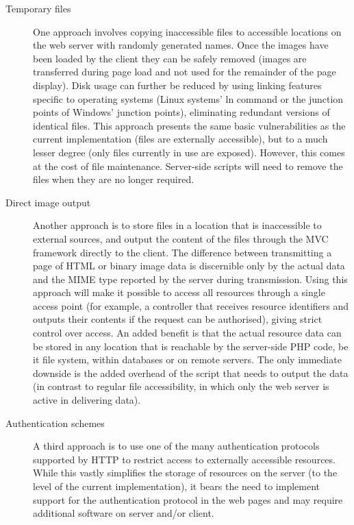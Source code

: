 \begin{description}
    \item[Temporary files] One approach involves copying inaccessible files to accessible locations on the web server with randomly generated names. Once the images have been loaded by the client they can be safely removed (images are transferred during page load and not used for the remainder of the page display). Disk usage can further be reduced by using linking features specific to operating systems (Linux systems' ln command or the junction points of Windows' junction points), eliminating redundant versions of identical files. This approach presents the same basic vulnerabilities as the current implementation (files are externally accessible), but to a much lesser degree (only files currently in use are exposed). However, this comes at the cost of file maintenance. Server-side scripts will need to remove the files when they are no longer required.
    \item[Direct image output] Another approach is to store files in a location that is inaccessible to external sources, and output the content of the files through the MVC framework directly to the client. The difference between transmitting a page of HTML or binary image data is discernible only by the actual data and the MIME type reported by the server during transmission. Using this approach will make it possible to access all resources through a single access point (for example, a controller that receives resource identifiers and outputs their contents if the request can be authorised), giving strict control over access. An added benefit is that the actual resource data can be stored in any location that is reachable by the server-side PHP code, be it file system, within databases or on remote servers. The only immediate downside is the added overhead of the script that needs to output the data (in contrast to regular file accessibility, in which only the web server is active in delivering data).
    \item[Authentication schemes] A third approach is to use one of the many authentication protocols supported by HTTP to restrict access to externally accessible resources. While this vastly simplifies the storage of resources on the server (to the level of the current implementation), it bears the need to implement support for the authentication protocol in the web pages and may require additional software on server and/or client.
\end{description}


